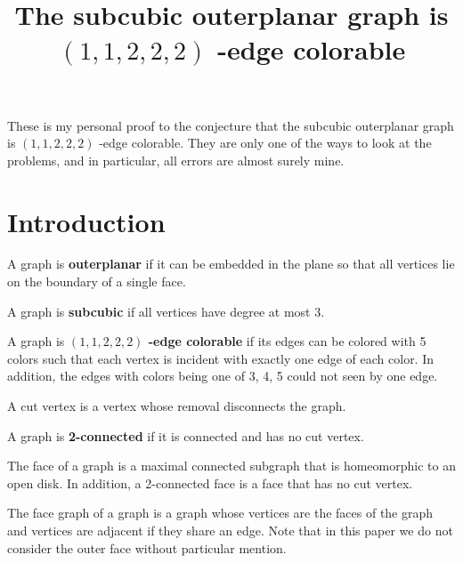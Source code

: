 \documentclass[a4paper]{article}
\title{The subcubic outerplanar graph is $(1,1,2,2,2)$ -edge colorable}
\begin{document}
\maketitle
\begin{center}\begin{minipage}[c]{0.9\textwidth}\centering\footnotesize These is my personal proof to the conjecture that the subcubic outerplanar graph is $(1,1,2,2,2)$ -edge colorable. They are only one of the ways to look at the problems, and in particular, all errors are almost surely mine.\end{minipage}\end{center}
\tableofcontents

\section{Introduction}
\begin{defi} A graph is \textbf{outerplanar} if it can be embedded in the plane so that all vertices lie on the boundary of a single face. \end{defi}
\begin{defi} A graph is \textbf{subcubic} if all vertices have degree at most 3. \end{defi}
\begin{defi}
A graph is \textbf{$(1,1,2,2,2)$ -edge colorable} if its edges can be colored with 5 colors such that each vertex is incident with exactly one edge of each color. In addition, the edges with colors being one of 3, 4, 5 could not seen by one edge.
\end{defi}
\begin{defi}
    A cut vertex is a vertex whose removal disconnects the graph.
\end{defi}
\begin{defi}
A graph is \textbf{2-connected} if it is connected and has no cut vertex.
\end{defi}
\begin{defi}
    The face of a graph is a maximal connected subgraph that is homeomorphic to an open disk. In addition, a 2-connected face is a face that has no cut vertex.
\end{defi}
\begin{defi}
    The face graph of a graph is a graph whose vertices are the faces of the graph and vertices are adjacent if they share an edge. Note that in this paper we do not consider the outer face without particular mention.
\end{defi}
\end{document}
